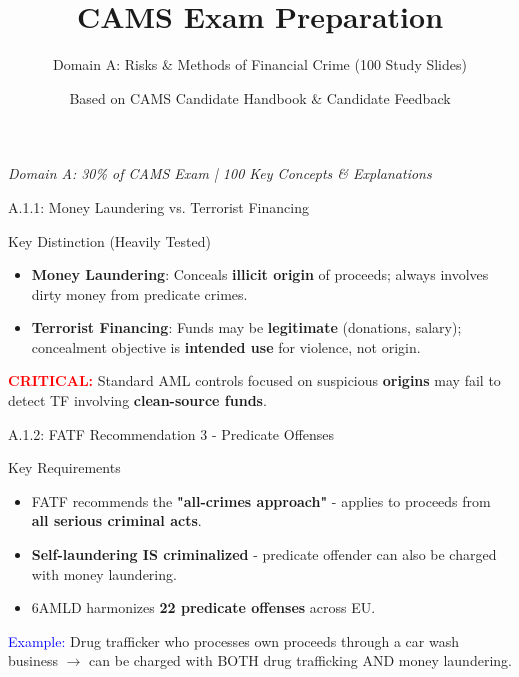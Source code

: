 \documentclass{beamer}
\title{CAMS Exam Preparation}
\subtitle{Domain A: Risks \& Methods of Financial Crime (100 Study Slides)}
\author{Based on CAMS Candidate Handbook \& Candidate Feedback}
\date{}
\begin{document}
	
	\begin{frame}
		\titlepage
		\centering
		\textit{Domain A: 30\% of CAMS Exam | 100 Key Concepts \& Explanations}
	\end{frame}
	
	
	\begin{frame}{A.1.1: Money Laundering vs. Terrorist Financing}
		\begin{block}{Key Distinction (Heavily Tested)}
			\begin{itemize}
				\item \textbf{Money Laundering}: Conceals \textbf{illicit origin} of proceeds; always involves dirty money from predicate crimes.
				\item \textbf{Terrorist Financing}: Funds may be \textbf{legitimate} (donations, salary); concealment objective is \textbf{intended use} for violence, not origin.
			\end{itemize}
		\end{block}
		\textcolor{red}{\textbf{CRITICAL:}} Standard AML controls focused on suspicious \textbf{origins} may fail to detect TF involving \textbf{clean-source funds}.
	\end{frame}
	
	\begin{frame}{A.1.2: FATF Recommendation 3 - Predicate Offenses}
		\begin{block}{Key Requirements}
			\begin{itemize}
				\item FATF recommends the \textbf{"all-crimes approach"} - applies to proceeds from \textbf{all serious criminal acts}.
				\item \textbf{Self-laundering IS criminalized} - predicate offender can also be charged with money laundering.
				\item 6AMLD harmonizes \textbf{22 predicate offenses} across EU.
			\end{itemize}
		\end{block}
		\textcolor{blue}{Example:} Drug trafficker who processes own proceeds through a car wash business $\rightarrow$ can be charged with BOTH drug trafficking AND money laundering.
	\end{frame}
	
\end{document}
